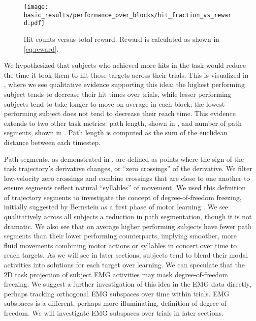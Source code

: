 \documentclass[../main.tex]{subfiles}
\begin{document}
\begin{figure}[!htb]%
    \centering
    \texttt{[image: basic\_results/performance\_over\_blocks/hit\_fraction\_vs\_reward.pdf]}
    \caption[Hits versus reward]{Hit counts versus total reward. Reward is calculated as shown in \cref{eq:reward}.}\label{fig:hit_fraction_vs_reward}
\end{figure}

We hypothesized that subjects who achieved more hits in the task would reduce the time it took them to hit those targets across their trials. This is visualized in , where we see qualitative evidence supporting this idea; the highest performing subject tends to decrease their hit times over trials, while lesser performing subjects tend to take longer to move on average in each block; the lowest performing subject does not tend to decrease their reach time. This evidence extends to two other task metrics: path length, shown in , and number of path segments, shown in . Path length is computed as the sum of the euclidean distance between each timestep. 

Path segments, as demonstrated in , are defined as points where the sign of the task trajectory's derivative changes, or ``zero crossings'' of the derivative. We filter low-velocity zero crossings and combine crossings that are close to one another to ensure segments reflect natural ``syllables'' of movement. We used this definition of trajectory segments to investigate the concept of degree-of-freedom freezing, initially suggested by Bernstein as a first phase of motor learning \cite{Bernstein1967}. We see qualitatively across all subjects a reduction in path segmentation, though it is not dramatic. We also see that on average higher performing subjects have fewer path segments than their lower performing counterparts, implying smoother, more fluid movements combining motor actions or syllables in concert over time to reach targets. As we will see in later sections, subjects tend to blend their modal activities into solutions for each target over learning. We can speculate that the 2D task projection of subject EMG activities may mask degree-of-freedom freezing. We suggest a further investigation of this idea in the EMG data directly, perhaps tracking orthogonal EMG subspaces over time within trials. EMG subspaces is a different, perhaps more illuminating, definition of degree of freedom. We will investigate EMG subspaces over trials in later sections.
\end{document}
